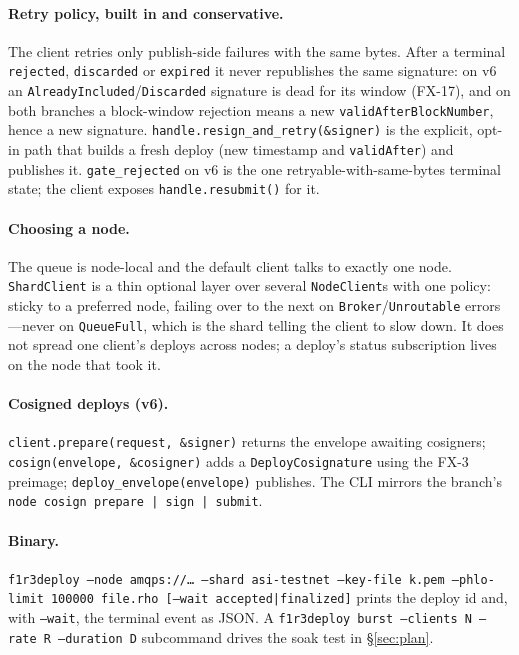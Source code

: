\documentclass[11pt]{article}
\newcommand{\code}[1]{\texttt{#1}}
\begin{document}
\paragraph{Retry policy, built in and conservative.} The client retries only
publish-side failures with the same bytes. After a terminal \code{rejected},
\code{discarded} or \code{expired} it never republishes the same signature: on v6 an
\code{AlreadyIncluded}/\code{Discarded} signature is dead for its window (FX-17), and
on both branches a block-window rejection means a new \code{validAfterBlockNumber},
hence a new signature. \code{handle.resign\_and\_retry(\&signer)} is the explicit,
opt-in path that builds a fresh deploy (new timestamp and \code{validAfter}) and
publishes it. \code{gate\_rejected} on v6 is the one retryable-with-same-bytes
terminal state; the client exposes \code{handle.resubmit()} for it.

\paragraph{Choosing a node.} The queue is node-local and the default client talks to
exactly one node. \code{ShardClient} is a thin optional layer over several
\code{NodeClient}s with one policy: sticky to a preferred node, failing over to the
next on \code{Broker}/\code{Unroutable} errors---never on \code{QueueFull}, which is
the shard telling the client to slow down. It does not spread one client's deploys
across nodes; a deploy's status subscription lives on the node that took it.

\paragraph{Cosigned deploys (v6).} \code{client.prepare(request, \&signer)} returns
the envelope awaiting cosigners; \code{cosign(envelope, \&cosigner)} adds a
\code{DeployCosignature} using the FX-3 preimage; \code{deploy\_envelope(envelope)}
publishes. The CLI mirrors the branch's \code{node cosign prepare | sign | submit}.

\paragraph{Binary.} \code{f1r3deploy --node amqps://\ldots\ --shard asi-testnet
--key-file k.pem --phlo-limit 100000 file.rho [--wait accepted|finalized]} prints
the deploy id and, with \code{--wait}, the terminal event as JSON. A
\code{f1r3deploy burst --clients N --rate R --duration D} subcommand drives the soak
test in \S\ref{sec:plan}.
\end{document}
